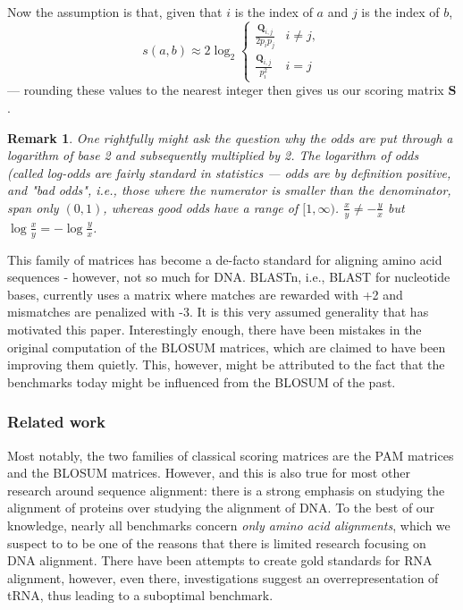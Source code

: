 \documentclass{article}
\newtheorem{remark}{Remark}
\begin{document}
\begin{multicols}{2}
Now the assumption is that, given that $i$ is the index of $a$ and $j$ is the index of $b$,
\begin{equation*}
	s(a, b) \approx	2 \log_2 \begin{cases}
		\frac{\mathbf Q_{i, j}}{2p_ip_j} & i \ne j, \\
		\frac{\mathbf Q_{i, j}}{p_i^2} & i = j
	\end{cases}
\end{equation*}
--- rounding these values to the nearest integer then gives us our scoring matrix $\mathbf S$.

\begin{remark}
	One rightfully might ask the question why the odds are put through a logarithm of base 2 and subsequently multiplied by 2. 
	The logarithm of odds (called \emph{log-odds} are fairly standard in statistics --- odds are by definition positive, and "bad odds", i.e., those where the numerator is smaller than the denominator, span only $(0, 1)$, whereas good odds have a range of $[1, \infty)$. $\frac x y \ne -\frac y x$ but $\log \frac x y = - \log \frac y x $.
	\end{remark}

This family of matrices has become a de-facto standard for aligning amino acid
sequences - however, not so much for DNA. BLASTn, i.e., BLAST for nucleotide bases, currently uses a matrix where
matches are rewarded with +2 and mismatches are penalized with -3. It is this very assumed generality that has motivated this paper.
Interestingly enough, there have been
mistakes in the original computation of the BLOSUM matrices, which are claimed
to have been improving them quietly. This, however, might be attributed to the
fact that the benchmarks today might be influenced from the BLOSUM of the past.
\subsubsection*{Related work}

Most notably, the two families of classical scoring matrices are the PAM
matrices and the BLOSUM matrices. However, and this is also true for most other
research around sequence alignment: there is a strong emphasis on studying the
alignment of proteins over studying the alignment of DNA. To the best of our
knowledge, nearly all benchmarks concern \emph{only amino acid alignments}, which
we suspect to to be one of the reasons that there is limited research focusing
on DNA alignment. There have been attempts to create gold standards for RNA
alignment,
however, even there, investigations suggest an overrepresentation of tRNA, thus
leading to a suboptimal benchmark.


\end{multicols}
\end{document}

